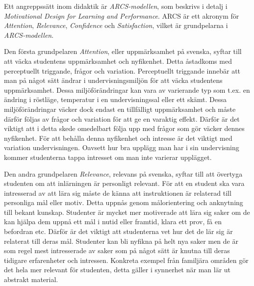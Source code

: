 \documentclass[]{article}
\begin{document}
Ett angreppssätt inom didaktik är \textit{ARCS-modellen}, som beskrivs i detalj i \textit{Motivational 
Design for Learning and Performance}. ARCS är ett akronym för \textit{Attention}, \textit{Relevance}, 
\textit{Confidence} och \textit{Satisfaction}, vilket är grundpelarna i \textit{ARCS-modellen}. 

Den första grundpelaren \textit{Attention}, eller uppmärksamhet på svenska, syftar till att väcka studentens 
uppmärksamhet och nyfikenhet. Detta åstadkoms med perceptuellt triggande, frågor och variation. 
Perceptuellt triggande innebär att man på något sätt ändrar i undervisningsmiljön för att väcka 
studentens uppmärksamhet. Dessa miljöförändringar kan vara av varierande typ som t.ex. en ändring i 
röstläge, temperatur i en undervisningssal eller ett skämt. Dessa miljöförändringar väcker dock endast 
en tillfälligt uppmärksamhet och måste därför följas av frågor och variation för att ge en varaktig 
effekt. Därför är det viktigt att i detta skede omedelbart följa upp med frågor som gör väcker dennes 
nyfikenhet. För att behålla denna nyfikenhet och intresse är det viktigt med variation undervisningen. 
Oavsett hur bra upplägg man har i sin undervisning kommer studenterna tappa intresset om man inte 
varierar upplägget.

Den andra grundpelaren \textit{Relevance}, relevans på svenska, syftar till att övertyga studenten om att 
inlärningen är personligt relevant. För att en student ska vara intresserad av att lära sig måste de 
känna att instruktionen är relaterad till personliga mål eller motiv. Detta uppnås genom målorientering 
och anknytning till bekant kunskap. Studenter är mycket mer motiverade att lära sig saker om de kan 
hjälpa dem uppnå ett mål i nutid eller framtid, klara ett prov, få en befordran etc. Därför är det 
viktigt att studenterna vet hur det de lär sig är relaterat till deras mål. Studenter kan bli nyfikna 
på helt nya saker men de är som regel mest intresserade av saker som på något sätt är knutna till deras 
tidigare erfarenheter och intressen. Konkreta exempel från familjära områden gör det hela mer relevant 
för studenten, detta gäller i synnerhet när man lär ut abstrakt material. 
\end{document}
